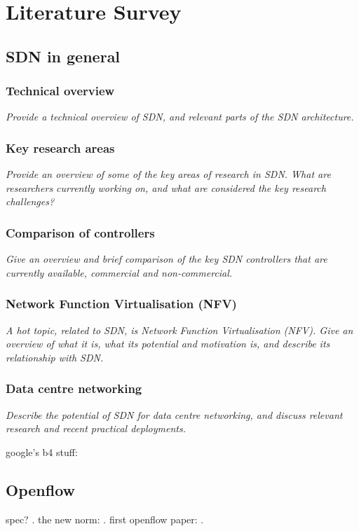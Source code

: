 \documentclass[pdftex,12pt,a4paper]{report}
\begin{document}
\chapter{Literature Survey}

\section{SDN in general}
\subsection{Technical overview}
\emph{Provide a technical overview of SDN, and relevant parts of the SDN architecture.}

\subsection{Key research areas}
\emph{Provide an overview of some of the key areas of research in SDN. What are researchers currently working on, and what are considered the key research challenges?}

\subsection{Comparison of controllers}
\emph{Give an overview and brief comparison of the key SDN controllers that are currently available, commercial and non-commercial.}

\subsection{Network Function Virtualisation (NFV)}
\emph{A hot topic, related to SDN, is Network Function Virtualisation (NFV). Give an overview of what it is, what its potential and motivation is, and describe its relationship with SDN.}

\subsection{Data centre networking}
\emph{Describe the potential of SDN for data centre networking, and discuss relevant research and recent practical deployments.}

google's b4 stuff: \cite{jain:b4}

\section{Openflow}
spec? \cite{onf:switch}. the new norm: \cite{onf:norm}. first openflow paper: \cite{mckeown:campus}.
\end{document}
